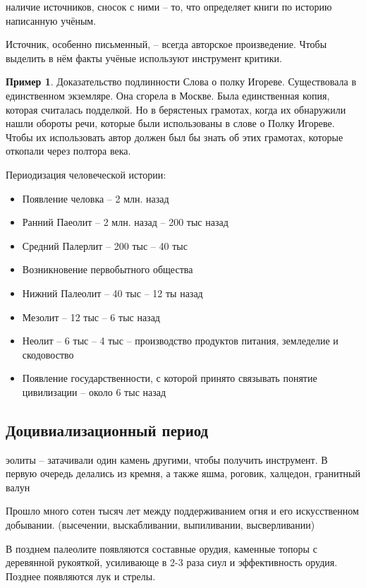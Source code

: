 \documentclass{book}
\theoremstyle{definition}
\newtheorem*{example}{Пример}
\begin{document}
    наличие источников, сносок с ними -- то, что определяет книги по историю написанную учёным.

    Источник, особенно письменный, -- всегда авторское произведение. Чтобы выделить в нём факты учёные используют инструмент критики.

    \begin{example}
        Доказательство подлинности Слова о полку Игореве. Существовала в единственном экземляре. Она сгорела в Москве. Была единственная копия, которая считалась подделкой. Но в берястеных грамотах, когда их обнаружили нашли обороты речи, которые были использованы в слове о Полку Игореве. Чтобы их использовать автор должен был бы знать об этих грамотах, которые откопали через полтора века.
    \end{example}

    Периодизация человеческой истории:
    \begin{itemize}
        \item Появление человка -- 2 млн. назад
        \item Ранний Паеолит -- 2 млн. назад -- 200 тыс назад
        \item Средний Палерлит -- 200 тыс -- 40 тыс
        \item Возникновение первобытного общества
            \item Нижний Палеолит -- 40 тыс -- 12 ты назад
            \item Мезолит -- 12 тыс --  6 тыс назад
            \item Неолит -- 6 тыс -- 4 тыс -- производство продуктов питания, земледелие и скодовоство
            \item Появление государственности, с которой принято связывать понятие цивилизации -- около 6 тыс назад
    \end{itemize}

    \subsection{Доцивиализационный период}

    эолиты -- затачивали один камень другими, чтобы получить инструмент. В первую очередь делались из кремня, а также яшма, роговик, халцедон, гранитный валун

    Прошло  много сотен тысяч лет между поддерживанием огня и его искусственном добывании. (высечении, выскабливании, выпиливании, высверливании)

    В позднем палеолите появляются составные орудия, каменные топоры с деревянной рукояткой, усиливающе в 2-3 раза сиул и эффективность орудия. Позднее появляются лук и стрелы.
\end{document}
